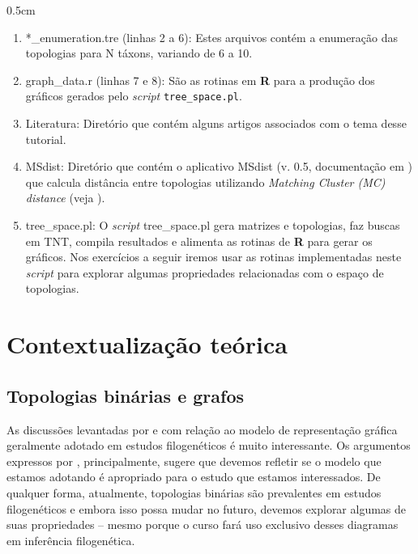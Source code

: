 \begin{refsection}
\begin {myindentpar}{0.5cm}
\begin{enumerate}[\itshape i.]
	\item{*\_enumeration.tre (linhas 2 a 6):} Estes arquivos contém a enumeração das topologias para N táxons, variando de 6 a 10.
	\item{graph\_data\*.r (linhas 7 e 8):} São as rotinas em \textbf{R} para a produção dos gráficos gerados pelo \textit{script} \texttt{tree\_space.pl}.
	\item{Literatura:} Diretório que contém alguns artigos associados com o tema desse tutorial.
	\item{MSdist:}  Diretório que contém o aplicativo MSdist (v. 0.5, documentação em \cite{Bogdanowicz_2010}) que calcula distância entre topologias utilizando \textit{Matching Cluster (MC) distance} (veja \cite{BogdanowiczETGiaro_2013}).
	\item{tree\_space.pl:}  O \textit{script} tree\_space.pl gera matrizes e topologias, faz buscas em TNT, compila resultados e alimenta as rotinas de \textbf{R} para gerar os gráficos. Nos exercícios a seguir iremos usar as rotinas implementadas neste \textit{script} para explorar algumas propriedades relacionadas com o espaço de topologias.

\end{enumerate}
\end{myindentpar}

\section{Contextualização teórica}\label{tut3:context}

\subsection{Topologias binárias e grafos}\label{tut3:context:graphs}
	As discussões levantadas por \textcite{Mindell_2013} e \textcite{Morrison_2014} com relação ao modelo de representação gráfica geralmente adotado em estudos filogenéticos é muito interessante. Os argumentos expressos por \textcite{Morrison_2014}, principalmente, sugere que devemos refletir se o modelo que estamos adotando é apropriado para o estudo que estamos interessados. De qualquer forma, atualmente, topologias binárias são prevalentes em estudos filogenéticos e embora isso possa mudar no futuro, devemos explorar algumas de suas propriedades -- mesmo porque o curso fará uso exclusivo desses diagramas em inferência filogenética.
	


\end{refsection}
